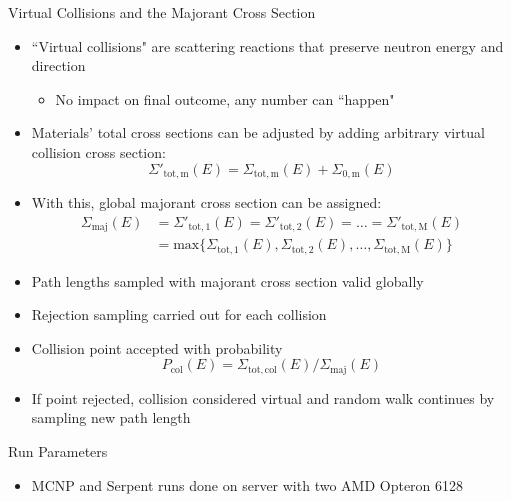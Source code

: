 \documentclass[final]{beamer}
\begin{document}
\begin{frame}{}
\begin{columns}[t]
      	\begin{column}{.3\linewidth}
            \begin{block}{Virtual Collisions and the Majorant Cross Section}
	\begin{itemize}
	\item{``Virtual collisions" are scattering reactions that preserve neutron energy and direction}
		\begin{itemize}
		\item{No impact on final outcome, any number can ``happen"}
		\end{itemize}
	\item{Materials' total cross sections can be adjusted by adding arbitrary virtual collision cross section:}
		\begin{equation*}
		\Sigma'_{\mathrm{tot,m}}(E) = \Sigma_{\mathrm{tot,m}}(E) + \Sigma_{\mathrm{0,m}}(E)
		\end{equation*}
	\item{With this, global majorant cross section can be assigned:}
		\begin{equation*}
		\begin{aligned}
		\Sigma_{\mathrm{maj}}(E) &=\Sigma'_{\mathrm{tot,1}}(E) = \Sigma'_{\mathrm{tot,2}}(E) = \ldots = \Sigma'_{\mathrm{tot,M}}(E) \\
		& = \mathrm{max}\{\Sigma_{\mathrm{tot,1}}(E), \Sigma_{\mathrm{tot,2}}(E),\ldots, \Sigma_{\mathrm{tot,M}}(E)\}
		\end{aligned}
		\end{equation*}
		\item{Path lengths sampled with majorant cross section valid globally}
		\item{Rejection sampling carried out for each collision}
		\item{Collision point accepted with probability}
		\begin{equation*} 
		P_{\mathrm{col}}(E) = \Sigma_{\mathrm{tot,col}}(E)/\Sigma_{\mathrm{maj}}(E)
		\end{equation*}
		\item{If point rejected, collision considered virtual and random walk 
		continues by sampling new path length \cite{serpent}}
	\end{itemize}
            \end{block}
		\vfill
        	\begin{block}{\large Run Parameters}
          		\begin{itemize}
			\item{MCNP and Serpent runs done on server with two AMD Opteron 6128 
}
\end{itemize}
\end{block}
\end{column}
\end{columns}
\end{frame}
\end{document}
